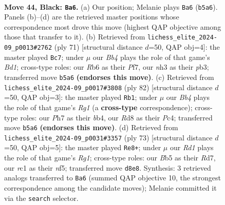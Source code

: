 \documentclass[11pt]{article}
\begin{document}
\clearpage

\begin{figure}[p]\centering
\begin{subfigure}{0.46\textwidth}\centering
\resizebox{\linewidth}{!}{%
\newchessgame
\chessboard[
  setfen={3r2k1/5p1p/1r6/pb6/3p2P1/1P3B1N/6RP/2R1K3 b - - 3 44},
  showmover=false,
  pgfstyle=straightmove, color=movearrow, markmove={b5-a6}
]}
\caption{}
\end{subfigure}\hfill
\begin{subfigure}{0.46\textwidth}\centering
\resizebox{\linewidth}{!}{%
\newchessgame
\chessboard[
  setfen={3b4/p2k1p2/8/1p1r3p/8/1P3KP1/P3R2P/4B3 b - - 3 36},
  showmover=false,
  pgfstyle=straightmove, color=movearrow, markmove={d8-c7}
]}
\caption{}
\end{subfigure}
\\[4pt]
\begin{subfigure}{0.46\textwidth}\centering
\resizebox{\linewidth}{!}{%
\newchessgame
\chessboard[
  setfen={r6k/1r5p/5p1B/2p5/1bP4P/3RP3/2K2P2/6R1 w - - 6 42},
  showmover=false,
  pgfstyle=straightmove, color=movearrow, markmove={g1-b1}
]}
\caption{}
\end{subfigure}\hfill
\begin{subfigure}{0.46\textwidth}\centering
\resizebox{\linewidth}{!}{%
\newchessgame
\chessboard[
  setfen={1k4r1/p2r1p2/1p6/5N1p/2P5/B3K2P/PP4b1/4R3 b - - 0 37},
  showmover=false,
  pgfstyle=straightmove, color=movearrow, markmove={g8-e8}
]}
\caption{}
\end{subfigure}
\caption{\textbf{Move 44, Black: \texttt{Ba6}.} (a) Our position; Melanie plays \texttt{Ba6} (\texttt{b5a6}). Panels (b)--(d) are the retrieved master positions whose correspondence most drove this move (highest QAP objective among those that transfer to it). (b) Retrieved from \texttt{lichess\_elite\_2024-09\_p0013\#2762} (ply 71) [structural distance $d$=50, QAP obj=4]: the master played \texttt{Bc7}; under $\mu$ our \emph{Bb4} plays the role of that game's \emph{Bd1}; cross-type roles: our \emph{R}b6 as their \emph{P}f7, our \emph{n}h3 as their \emph{p}b3; transferred move \texttt{b5a6} \textbf{(endorses this move)}. (c) Retrieved from \texttt{lichess\_elite\_2024-09\_p0017\#3808} (ply 82) [structural distance $d$=50, QAP obj=3]: the master played \texttt{Rb1}; under $\mu$ our \emph{Bb4} plays the role of that game's \emph{Rg1} (a \textbf{cross-type} correspondence); cross-type roles: our \emph{P}h7 as their \emph{b}b4, our \emph{R}d8 as their \emph{P}c4; transferred move \texttt{b5a6} \textbf{(endorses this move)}. (d) Retrieved from \texttt{lichess\_elite\_2024-09\_p0031\#3357} (ply 73) [structural distance $d$=50, QAP obj=5]: the master played \texttt{Re8+}; under $\mu$ our \emph{Rd1} plays the role of that game's \emph{Rg1}; cross-type roles: our \emph{B}b5 as their \emph{R}d7, our \emph{r}c1 as their \emph{n}f5; transferred move \texttt{d8e8}. Synthesis: 3 retrieved analogs transferred to \texttt{Ba6} (summed QAP objective 10, the strongest correspondence among the candidate moves); Melanie committed it via the \texttt{search} selector.}
\label{fig:thought-m87}
\end{figure}
\end{document}
